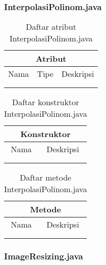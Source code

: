 \subsubsection{InterpolasiPolinom.java}

\begin{table}[H]
    \centering
    \begin{tabular}{c|c|c}
        \hline
        \hline
        \multicolumn{3}{c}{\textbf{Atribut}}\\
        \hline
        \hline
         Nama & Tipe & Deskripsi \\
         \hline 
         \hline 
         &  & \\
         &  & \\
    \end{tabular}
    \caption{Daftar atribut InterpolasiPolinom.java}
\end{table}

\begin{table}[H]
    \centering
    \begin{tabular}{c|c}
        \hline
        \hline
        \multicolumn{2}{c}{\textbf{Konstruktor}}\\
        \hline
        \hline
         Nama  & Deskripsi \\
         \hline 
         \hline 
         &  \\
         &  \\
    \end{tabular}
    \caption{Daftar konstruktor InterpolasiPolinom.java}
\end{table}

\begin{table}[H]
    \centering
    \begin{tabular}{c|c}
        \hline
        \hline
        \multicolumn{2}{c}{\textbf{Metode}}\\
        \hline
        \hline
         Nama  & Deskripsi \\
         \hline 
         \hline 
         &  \\
         &  \\
    \end{tabular}
    \caption{Daftar metode InterpolasiPolinom.java}
\end{table}

\subsubsection{ImageResizing.java}

